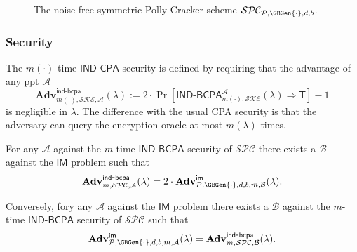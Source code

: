 \documentclass[10pt]{beamer}
\newcommand{\px}{\phantom{x}}
\newcommand{\SPC}{\ensuremath{\mathcal{SPC}}\xspace}
\newcommand{\SKE}{\ensuremath{\mathcal{SKE}}\xspace}
\newcommand{\secpar}{\lambda}
\newcommand{\Eval}{\mathsf{Eval}}
\newcommand{\PK}{\mathsf{PK}}
\newcommand{\Circt}{C}
\newcommand{\A}{\ensuremath{\mathcal{A}}\xspace}
\newcommand{\B}{\ensuremath{\mathcal{B}}\xspace}
\newcommand{\IND}{\mathsf{IND}}
\newcommand{\ind}{\mathsf{ind}}
\newcommand{\CPA}{\mathsf{CPA}}
\newcommand{\BCPA}{\mathsf{BCPA}}
\newcommand{\bcpa}{\mathsf{bcpa}}
\newcommand{\Adv}{\mathbf{Adv}}
\newcommand{\true}{\mathsf{T}}
\newcommand{\IM}{\ensuremath{\mathsf{IM}}\xspace}
\begin{document}
\begin{frame}[allowframebreaks]
\begin{figure}[ht]
\caption{The noise-free symmetric Polly Cracker scheme $\SPC_{\mathcal{P},\GBGen{\cdot},d,b}$.}
\label{fig.spc}
\end{figure}
\end{frame}

\begin{frame}
\frametitle{Security}
The $m(\cdot)$-time $\IND\mbox{-}\CPA$ security is defined by requiring that the advantage of any ppt $\A$
\[
\Adv^{\ind\mbox{-}\bcpa}_{m(\cdot),\SKE,\A}(\secpar) := 2\cdot \Pr \left[ {\IND\mbox{-}\BCPA}^{\A}_{m(\cdot),\SKE}(\secpar) \Rightarrow \true \right] - 1 
\]
is negligible in $\lambda$. The difference with the usual CPA security is that the adversary can query the encryption oracle at most  $m(\secpar)$ times. 

\begin{theorem}
\label{thm:spc}
For any  $\A$ against the $m$-time $\IND\mbox{-}\BCPA$ security of $\SPC$ there exists a $\B$ against the \IM problem such that
\[
\Adv^{\ind\mbox{-}\bcpa}_{m,\SPC,\A}(\secpar)  = 
2\cdot \Adv^{\mathsf{im}}_{\mathcal{P},\GBGen{\cdot},d,b,m,\B}(\secpar).
\]

Conversely, fory any $\A$ against the \IM problem there exists a $\B$ against the $m$-time $\IND\mbox{-}\BCPA$ security of $\SPC$ such that 
\[
\Adv^{\mathsf{im}}_{\mathcal{P},\GBGen{\cdot},d,b,m,\A}(\secpar) =
\Adv^{\ind\mbox{-}\bcpa}_{m,\SPC,\B}(\secpar).
\]
\end{theorem}

\end{frame}
\end{document}
